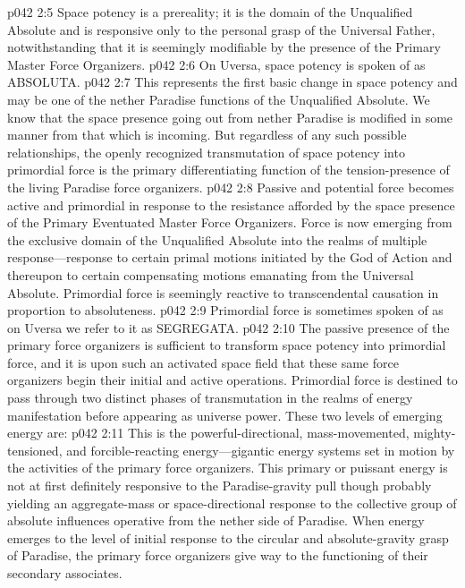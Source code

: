 \vs p042 2:5 Space potency is a prereality; it is the domain of the Unqualified Absolute and is responsive only to the personal grasp of the Universal Father, notwithstanding that it is seemingly modifiable by the presence of the Primary Master Force Organizers.
\vs p042 2:6 On Uversa, space potency is spoken of as ABSOLUTA.
\pc \vs p042 2:7 \bibnobreakspace {} This represents the first basic change in space potency and may be one of the nether Paradise functions of the Unqualified Absolute. We know that the space presence going out from nether Paradise is modified in some manner from that which is incoming. But regardless of any such possible relationships, the openly recognized transmutation of space potency into primordial force is the primary differentiating function of the tension\hyp{}presence of the living Paradise force organizers.
\vs p042 2:8 Passive and potential force becomes active and primordial in response to the resistance afforded by the space presence of the Primary Eventuated Master Force Organizers. Force is now emerging from the exclusive domain of the Unqualified Absolute into the realms of multiple response---response to certain primal motions initiated by the God of Action and thereupon to certain compensating motions emanating from the Universal Absolute. Primordial force is seemingly reactive to transcendental causation in proportion to absoluteness.
\vs p042 2:9 Primordial force is sometimes spoken of as  on Uversa we refer to it as SEGREGATA.
\pc \vs p042 2:10 \bibnobreakspace {} The passive presence of the primary force organizers is sufficient to transform space potency into primordial force, and it is upon such an activated space field that these same force organizers begin their initial and active operations. Primordial force is destined to pass through two distinct phases of transmutation in the realms of energy manifestation before appearing as universe power. These two levels of emerging energy are:
\pc \vs p042 2:11 \bibnobreakspace {} This is the powerful\hyp{}directional, mass\hyp{}movemented, mighty\hyp{}tensioned, and forcible\hyp{}reacting energy---gigantic energy systems set in motion by the activities of the primary force organizers. This primary or puissant energy is not at first definitely responsive to the Paradise\hyp{}gravity pull though probably yielding an aggregate\hyp{}mass or space\hyp{}directional response to the collective group of absolute influences operative from the nether side of Paradise. When energy emerges to the level of initial response to the circular and absolute\hyp{}gravity grasp of Paradise, the primary force organizers give way to the functioning of their secondary associates.
